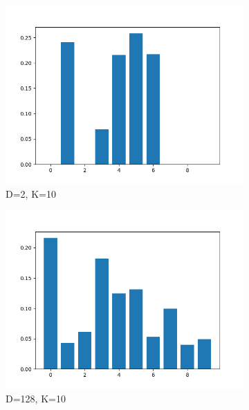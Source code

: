 \documentclass[conference]{IEEEtran}
\begin{document}
\begin{figure}
\begin{subfigure}[b]{.5\linewidth}
        \centering
        \includegraphics[width=1\linewidth]{images/eval/weights_BGMM_d2_k10.png}
        \caption{D=2, K=10}
        \label{fig:dblp_weights_d2_k10}
    \end{subfigure}%
    \begin{subfigure}[b]{.5\linewidth}
        \centering
        \includegraphics[width=1\linewidth]{images/eval/weights_BGMM_d128_k10.png}
        \caption{D=128, K=10}
        \label{fig:dblp_weights_d128_k10}
    \end{subfigure}
    \begin{subfigure}[b]{.5\linewidth}
        \centering

\end{subfigure}
\end{figure}
\end{document}
